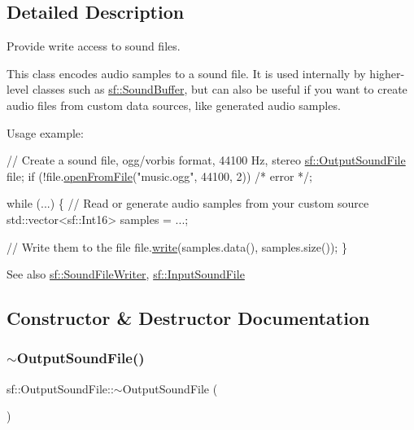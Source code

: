 \subsection{Detailed Description}
Provide write access to sound files. 

This class encodes audio samples to a sound file. It is used internally by higher-\/level classes such as \hyperlink{classsf_1_1_sound_buffer}{sf\+::\+Sound\+Buffer}, but can also be useful if you want to create audio files from custom data sources, like generated audio samples.

Usage example\+: 
\begin{DoxyCode}
\textcolor{comment}{// Create a sound file, ogg/vorbis format, 44100 Hz, stereo}
\hyperlink{classsf_1_1_output_sound_file}{sf::OutputSoundFile} file;
\textcolor{keywordflow}{if} (!file.\hyperlink{classsf_1_1_output_sound_file_ae5e55f01c53c1422c44eaed2eed67fce}{openFromFile}(\textcolor{stringliteral}{"music.ogg"}, 44100, 2))
    \textcolor{comment}{/* error */};

\textcolor{keywordflow}{while} (...)
\{
    \textcolor{comment}{// Read or generate audio samples from your custom source}
    std::vector<sf::Int16> samples = ...;

    \textcolor{comment}{// Write them to the file}
    file.\hyperlink{classsf_1_1_output_sound_file_adfcf525fced71121f336fa89faac3d67}{write}(samples.data(), samples.size());
\}
\end{DoxyCode}


\begin{DoxySeeAlso}{See also}
\hyperlink{classsf_1_1_sound_file_writer}{sf\+::\+Sound\+File\+Writer}, \hyperlink{classsf_1_1_input_sound_file}{sf\+::\+Input\+Sound\+File} 
\end{DoxySeeAlso}


\subsection{Constructor \& Destructor Documentation}
\mbox{\label{classsf_1_1_output_sound_file_a1492adbfef1f391d720afb56f068182e}} 
\subsubsection{\texorpdfstring{$\sim$\+Output\+Sound\+File()}{~OutputSoundFile()}}
{\footnotesize\ttfamily sf\+::\+Output\+Sound\+File\+::$\sim$\+Output\+Sound\+File (\begin{DoxyParamCaption}{ }\end{DoxyParamCaption})}



